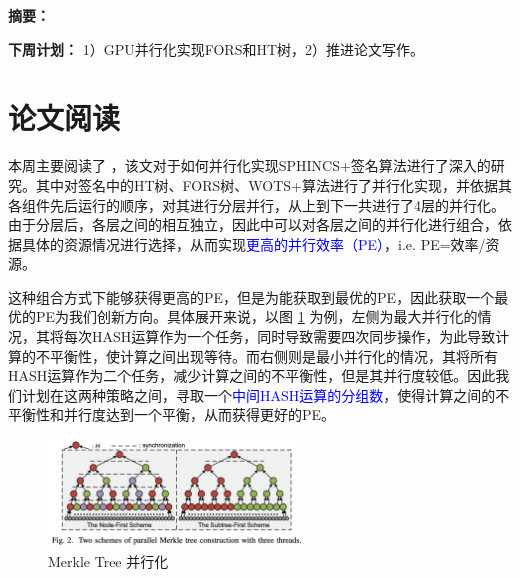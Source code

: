 \documentclass[report]{../../custom}
\begin{document}
\maketitle

\noindent \textbf{摘要：}

\vskip 0.5cm

\noindent \textbf{下周计划：} 1）GPU并行化实现FORS和HT树，2）推进论文写作。

\section{论文阅读}

本周主要阅读了 \cite{Wang2025}，该文对于如何并行化实现SPHINCS+签名算法进行了深入的研究。其中对签名中的HT树、FORS树、WOTS+算法进行了并行化实现，并依据其各组件先后运行的顺序，对其进行分层并行，从上到下一共进行了4层的并行化。由于分层后，各层之间的相互独立，因此\cite{Wang2025}中可以对各层之间的并行化进行组合，依据具体的资源情况进行选择，从而实现\textcolor{blue}{更高的并行效率（PE）}，i.e. PE=效率/资源。

这种组合方式下能够获得更高的PE，但是为能获取到最优的PE，因此获取一个最优的PE为我们创新方向。具体展开来说，以图 \ref{fig:merkle_tree_paralle} 为例，左侧为最大并行化的情况，其将每次HASH运算作为一个任务，同时导致需要四次同步操作，为此导致计算的不平衡性，使计算之间出现等待。而右侧则是最小并行化的情况，其将所有HASH运算作为二个任务，减少计算之间的不平衡性，但是其并行度较低。因此我们计划在这两种策略之间，寻取一个\textcolor{blue}{中间HASH运算的分组数}，使得计算之间的不平衡性和并行度达到一个平衡，从而获得更好的PE。

\begin{figure}[!ht]
  \centering
  \includegraphics[width=0.6\textwidth]{./fig/merkle_tree_paralle.png}
  \caption{Merkle Tree 并行化\cite{Wang2025}}
  \label{fig:merkle_tree_paralle}
\end{figure}



\end{document}

